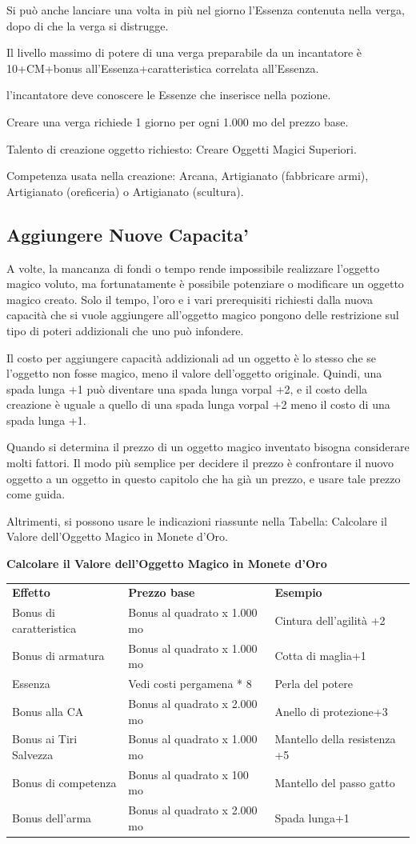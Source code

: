 \documentclass[a4paper,11pt,twoside,openany]{book}
\begin{document}
{Si può anche lanciare una volta in più nel giorno l'Essenza contenuta nella verga, dopo di che la verga si distrugge.

Il livello massimo di potere di una verga preparabile da un incantatore è 10+CM+bonus all'Essenza+caratteristica correlata all'Essenza.

l'incantatore deve conoscere le Essenze che inserisce nella pozione.

Creare una verga richiede 1 giorno per ogni 1.000 mo del prezzo base.

Talento di creazione oggetto richiesto: Creare Oggetti Magici Superiori.

Competenza usata nella creazione: Arcana, Artigianato (fabbricare armi), Artigianato (oreficeria) o Artigianato (scultura).

\subsection{Aggiungere Nuove Capacita'}

A volte, la mancanza di fondi o tempo rende impossibile realizzare l'oggetto magico voluto, ma fortunatamente è possibile potenziare o modificare un oggetto magico creato. Solo il tempo, l'oro e i vari prerequisiti richiesti dalla nuova capacità che si vuole aggiungere all'oggetto magico pongono delle restrizione sul tipo di poteri addizionali che uno può infondere.

Il costo per aggiungere capacità addizionali ad un oggetto è lo stesso che se l'oggetto non fosse magico, meno il valore dell'oggetto originale. Quindi, una spada lunga +1 può diventare una spada lunga vorpal +2, e il costo della creazione è uguale a quello di una spada lunga vorpal +2 meno il costo di una spada lunga +1.

Quando si determina il prezzo di un oggetto magico inventato bisogna considerare molti fattori. Il modo più semplice per decidere il prezzo è confrontare il nuovo oggetto a un oggetto in questo capitolo che ha già un prezzo, e usare tale prezzo come guida.

Altrimenti, si possono usare le indicazioni riassunte nella Tabella: Calcolare il Valore dell'Oggetto Magico in Monete d'Oro.

\bigskip

\textbf{Calcolare il Valore dell'Oggetto Magico in Monete d'Oro}

\begin{tabular}{lll}
\toprule
\textbf{Effetto} & \textbf{Prezzo base} & \textbf{Esempio}\tabularnewline
Bonus di caratteristica & Bonus al quadrato x 1.000 mo & Cintura dell'agilità +2\tabularnewline
Bonus di armatura & Bonus al quadrato x 1.000 mo & Cotta di maglia+1\tabularnewline
Essenza & Vedi costi pergamena {*} 8 & Perla del potere\tabularnewline
Bonus alla CA & Bonus al quadrato x 2.000 mo & Anello di protezione+3\tabularnewline
Bonus ai Tiri Salvezza & Bonus al quadrato x 1.000 mo & Mantello della resistenza +5\tabularnewline
Bonus di competenza & Bonus al quadrato x 100 mo & Mantello del passo gatto\tabularnewline
Bonus dell'arma & Bonus al quadrato x 2.000 mo & Spada lunga+1\tabularnewline
\end{tabular}

}
\end{document}
